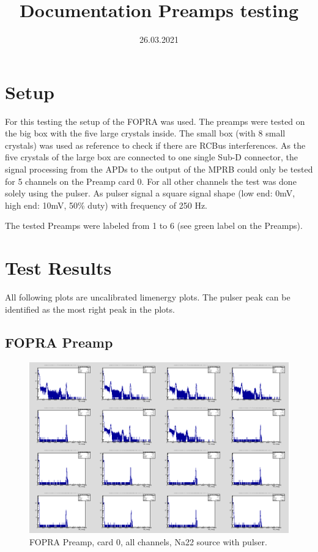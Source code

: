 \documentclass{report}
\title{Documentation Preamps testing}
\date{26.03.2021}
\begin{document}
\maketitle




\section{Setup}
For this testing the setup of the FOPRA was used. The preamps were tested on the big box with the five large crystals inside. The small box (with 8 small crystals) was used as reference to check if there are RCBus interferences. As the five crystals of the large box are connected to one single Sub-D connector, the signal processing from the APDs to the output of the MPRB could only be tested for 5 channels on the Preamp card 0. For all other channels the test was done solely using the pulser. As pulser signal a square signal shape (low end: 0mV, high end: 10mV, 50\% duty) with frequency of 250 Hz.

The tested Preamps were labeled from 1 to 6 (see green label on the Preamps).

\newpage

\section{Test Results} \label{documentclasses}
All following plots are uncalibrated lim\textunderscore energy plots. The pulser peak can be identified as the most right peak in the plots.
\subsection{FOPRA Preamp}

\begin{figure}[!htb]
  \includegraphics[width=\linewidth]{fopra_preamp_lim_energy_card0_all.png}
  \caption{FOPRA Preamp, card 0, all channels, Na22 source  with pulser.}
\end{figure}
\end{document}
